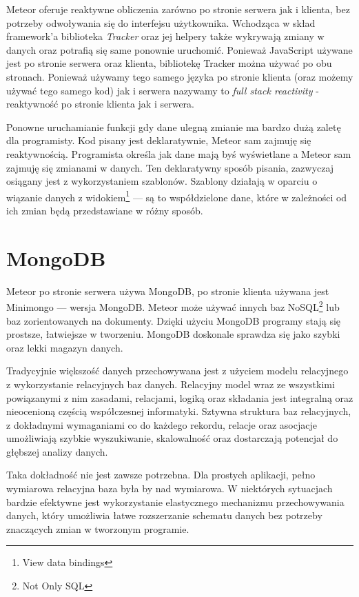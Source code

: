 Meteor oferuje reaktywne obliczenia zarówno po stronie serwera jak i klienta, bez potrzeby odwoływania się do interfejsu użytkownika. Wchodząca w skład framework'a biblioteka \emph{Tracker} oraz jej helpery także wykrywają zmiany w danych oraz potrafią się same ponownie uruchomić. Ponieważ JavaScript używane jest po stronie serwera oraz klienta, bibliotekę Tracker można używać po obu stronach. Ponieważ używamy tego samego języka po stronie klienta (oraz możemy używać tego samego kod) jak i serwera nazywamy to \emph{full stack reactivity} - reaktywność po stronie klienta jak i serwera.

Ponowne uruchamianie funkcji gdy dane ulegną zmianie ma bardzo dużą zaletę dla programisty. Kod pisany jest deklaratywnie, Meteor sam zajmuję się reaktywnością. Programista określa jak dane mają byś wyświetlane a Meteor sam zajmuję się zmianami w danych. Ten deklaratywny sposób pisania, zazwyczaj osiągany jest z wykorzystaniem szablonów. Szablony działają w oparciu o wiązanie danych z widokiem\footnote{View data bindings} --- są to współdzielone dane, które w zależności od ich zmian będą przedstawiane w różny sposób\cite{strack15}. 

\section{MongoDB}

Meteor po stronie serwera używa MongoDB, po stronie klienta używana jest Minimongo --- wersja MongoDB. Meteor może używać innych baz NoSQL\footnote{Not Only SQL} lub baz zorientowanych na dokumenty. Dzięki użyciu MongoDB programy stają się prostsze, łatwiejsze w tworzeniu. MongoDB doskonale sprawdza się jako szybki oraz lekki magazyn danych.

Tradycyjnie większość danych przechowywana jest z użyciem modelu relacyjnego z wykorzystanie relacyjnych baz danych. Relacyjny model wraz ze wszystkimi powiązanymi z nim zasadami, relacjami, logiką oraz składania jest integralną oraz nieocenioną częścią współczesnej informatyki. Sztywna struktura baz relacyjnych, z dokładnymi wymaganiami co do każdego rekordu, relacje oraz asocjacje umożliwiają szybkie wyszukiwanie, skalowalność oraz dostarczają potencjał do głębszej analizy danych.

Taka dokładność nie jest zawsze potrzebna. Dla prostych aplikacji, pełno wymiarowa relacyjna baza była by nad wymiarowa. W niektórych sytuacjach bardzie efektywne jest wykorzystanie elastycznego mechanizmu przechowywania danych, który umożliwia łatwe rozszerzanie schematu danych bez potrzeby znaczących zmian w tworzonym programie.

